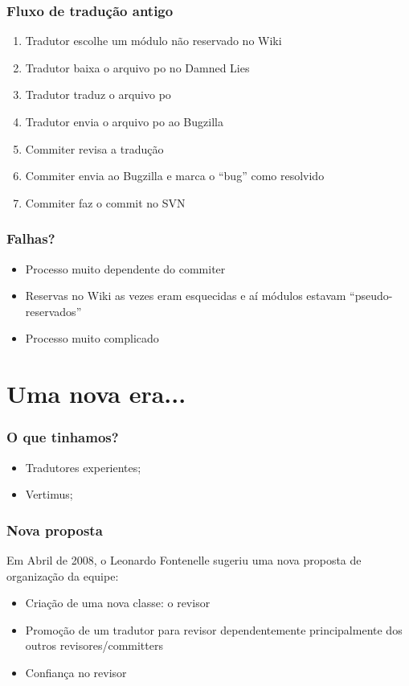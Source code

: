 \documentclass{beamer}
\begin{document}
\begin{frame}
    \frametitle{Fluxo de tradução antigo}
    \begin{enumerate}[<+->]
        \item Tradutor escolhe um módulo não reservado no Wiki
        \item Tradutor baixa o arquivo po no Damned Lies
        \item Tradutor traduz o arquivo po
        \item Tradutor envia o arquivo po ao Bugzilla
        \item Commiter revisa a tradução 
        \item Commiter envia ao Bugzilla e marca o ``bug'' como resolvido
        \item Commiter faz o commit no SVN
    \end{enumerate}
\end{frame}

\begin{frame}
    \frametitle{Falhas?}
    \begin{itemize}[<+->]
        \item Processo muito dependente do commiter
        \item Reservas no Wiki as vezes eram esquecidas e aí módulos estavam ``pseudo-reservados''
        \item Processo muito complicado
    \end{itemize}
\end{frame}

\section{Uma nova era...}

\begin{frame}
    \frametitle{O que tinhamos?}
    \begin{itemize}[<+->]
        \item Tradutores experientes;
        \item Vertimus;
    \end{itemize}
\end{frame}

\begin{frame}
    \frametitle{Nova proposta}  
    Em Abril de 2008, o Leonardo Fontenelle sugeriu uma nova proposta de organização da equipe:
    \begin{itemize}[<+->]
        \item Criação de uma nova classe: o revisor
        \item Promoção de um tradutor para revisor dependentemente principalmente dos outros revisores/committers
        \item Confiança no revisor
    \end{itemize}
\end{frame}
\end{document}
